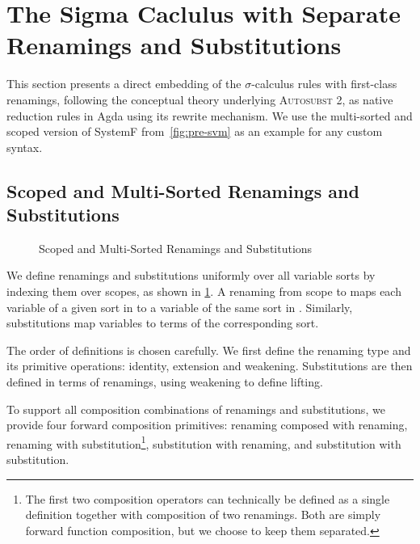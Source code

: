 \documentclass[screen,nonacm]{acmart}
\begin{document}
\section{The Sigma Caclulus with Separate Renamings and Substitutions}\label{sec:mis}
This section presents a direct embedding of the $σ$-calculus rules with
first-class renamings, following the conceptual theory underlying
\textsc{Autosubst 2}, as native reduction rules in Agda using its rewrite
mechanism. We use the multi-sorted and scoped version of SystemF
from~\cref{fig:pre-svm} as an example for any custom syntax.

\subsection{Scoped and Multi-Sorted Renamings and Substitutions}\label{sec:mis-sub}
\begin{figure}[t]
      \centering
      \small
      \begin{minipage}[t]{0.48\linewidth}
            \small
            \raggedright{}
            \ERen{}
      \end{minipage}
      \hfill
      \begin{minipage}[t]{0.48\linewidth}
            \small
            \raggedright{}
            \ESub{}
      \end{minipage}
      \caption{Scoped and Multi-Sorted Renamings and Substitutions}\label{fig:mis-ras}
\end{figure}

We define renamings and substitutions uniformly over all variable sorts by
indexing them over scopes, as shown in \cref{fig:mis-ras}. A renaming from
scope  to  maps each variable of a given sort in
 to a variable of the same sort in . Similarly,
substitutions map variables to terms of the corresponding sort.

The order of definitions is chosen carefully. We first define the renaming type
and its primitive operations: identity, extension and weakening. Substitutions
are then defined in terms of renamings, using weakening to define lifting.

To support all composition combinations of renamings and substitutions, we
provide four forward composition primitives: renaming composed with renaming,
renaming with substitution\footnote{The first two composition operators can
      technically be defined as a single definition together with composition of two
      renamings. Both are simply forward function composition, but we choose to keep
      them separated.}, substitution with renaming, and substitution with
substitution.
\end{document}

